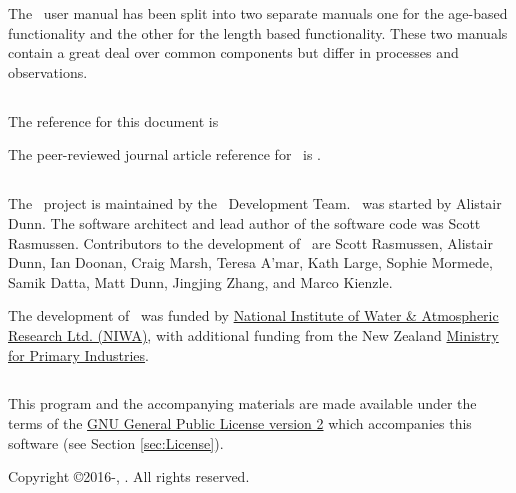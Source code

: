 The \CNAME\ user manual has been split into two separate manuals one for the age-based functionality and the other for the length based functionality. These two manuals contain a great deal over common components but differ in processes and observations.

\subsection{}

The reference for this document is \ManualRef

The peer-reviewed journal article reference for \CNAME\ is \citep{doonan_casal2}.

\subsection{}

The \CNAME\ project is maintained by the \CNAME\ Development Team. \CNAME\ was started by Alistair Dunn. The software architect and lead author of the software code was Scott Rasmussen. Contributors to the development of \CNAME\ are Scott Rasmussen, Alistair Dunn, Ian Doonan, Craig Marsh, Teresa A'mar, Kath Large, Sophie Mormede, Samik Datta, Matt Dunn, Jingjing Zhang, and Marco Kienzle.

The development of \CNAME\ was funded by \href{http://www.niwa.co.nz}{National Institute of Water \& Atmospheric Research Ltd. (NIWA)}, with additional funding from the New Zealand \href{http://www.mpi.govt.nz}{Ministry for Primary Industries}.

\subsection{}

This program and the accompanying materials are made available under the terms of the \href{http://www.opensource.org/licenses/GPL-2.0}{GNU General Public License version 2} which accompanies this software (see Section \ref{sec:License}).

Copyright \copyright 2016-\SourceControlYearDoc, \href{https://www.niwa.co.nz}{\Organisation}. All rights reserved.

\subsection{}

